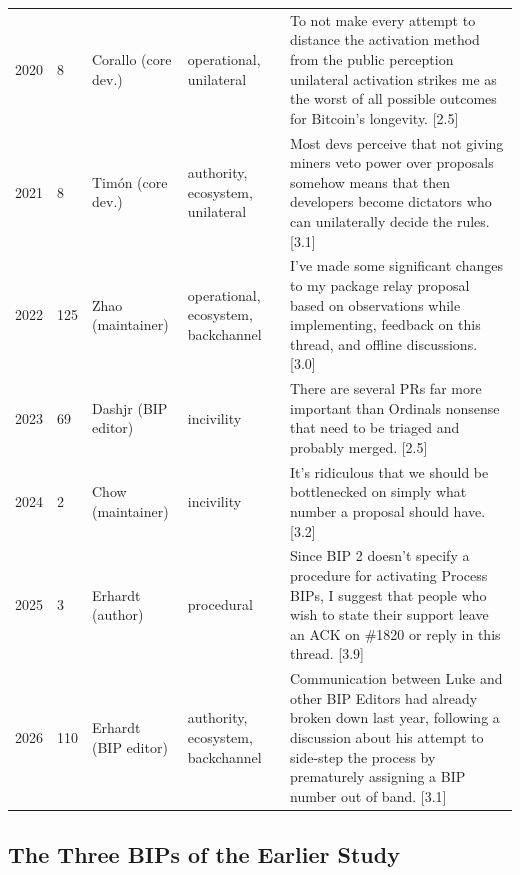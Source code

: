 \documentclass[sigconf,screen]{acmart}
\begin{document}
\begin{table}[t]
\begin{tabular}{p{}p{}p{}p{}p{}}
2020 & 8 & Corallo (core dev.) & operational, unilateral & To not make every attempt to distance the activation method from the public perception unilateral activation strikes me as the worst of all possible outcomes for Bitcoin's longevity. [2.5] \\
2021 & 8 & Tim\'on (core dev.) & authority, ecosystem, unilateral & Most devs perceive that not giving miners veto power over proposals somehow means that then developers become dictators who can unilaterally decide the rules. [3.1] \\
2022 & 125 & Zhao (maintainer) & operational, ecosystem, backchannel & I've made some significant changes to my package relay proposal based on observations while implementing, feedback on this thread, and offline discussions. [3.0] \\
2023 & 69 & Dashjr (BIP editor) & incivility & There are several PRs far more important than Ordinals nonsense that need to be triaged and probably merged. [2.5] \\
2024 & 2 & Chow (maintainer) & incivility & It's ridiculous that we should be bottlenecked on simply what number a proposal should have. [3.2] \\
2025 & 3 & Erhardt (author) & procedural & Since BIP 2 doesn't specify a procedure for activating Process BIPs, I suggest that people who wish to state their support leave an ACK on \#1820 or reply in this thread. [3.9] \\
2026 & 110 & Erhardt (BIP editor) & authority, ecosystem, backchannel & Communication between Luke and other BIP Editors had already broken down last year, following a discussion about his attempt to side-step the process by prematurely assigning a BIP number out of band. [3.1] \\
\bottomrule
\end{tabular}
\end{table}

\subsection{The Three BIPs of the Earlier Study}
\label{sec:icis}
\end{document}
